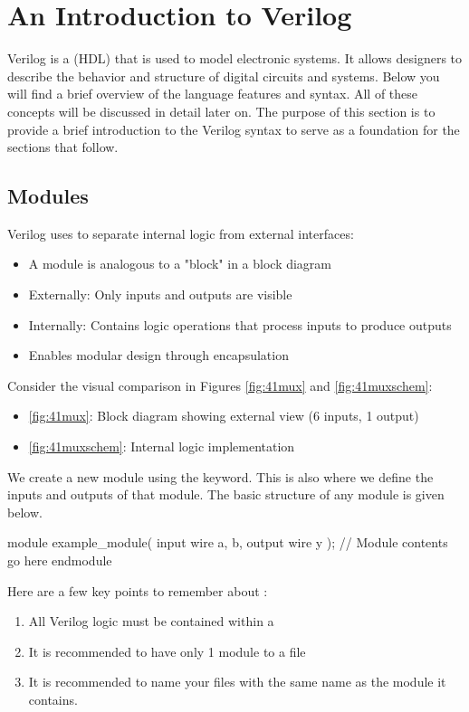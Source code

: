 \documentclass[12pt]{labmanual}
\begin{document}
\section{An Introduction to Verilog}

Verilog is a  (HDL) that is used to model electronic systems. It allows designers to describe the behavior and structure of digital circuits and systems. Below you will find a brief overview of the language features and syntax. All of these concepts will be discussed in detail later on. The purpose of this section is to provide a brief introduction to the Verilog syntax to serve as a foundation for the sections that follow.

\subsection{Modules}
Verilog uses  to separate internal logic from external interfaces:

\begin{itemize} 
\item A module is analogous to a "block" in a block diagram 
\item Externally: Only inputs and outputs are visible 
\item Internally: Contains logic operations that process inputs to produce outputs \item Enables modular design through encapsulation 
\end{itemize}

Consider the visual comparison in Figures \ref{fig:41mux} and \ref{fig:41muxschem}: \begin{itemize} 
\item \ref{fig:41mux}: Block diagram showing external view (6 inputs, 1 output) \item \ref{fig:41muxschem}: Internal logic implementation
\end{itemize}

We create a new module using the  keyword. This is also where we define the inputs and outputs of that module. The basic structure of any module is given below.

\begin{codeblock}[language=verilog]    
module example_module(
    input wire a, b,
    output wire y
);
    // Module contents go here
endmodule
\end{codeblock}

\begin{important}
    Here are a few key points to remember about :
    \begin{enumerate}
        \item All Verilog logic must be contained within a 
        \item It is recommended to have only 1 module to a file
        \item It is recommended to name your files with the same name as the module it contains.
    \end{enumerate}
\end{important}
\end{document}
